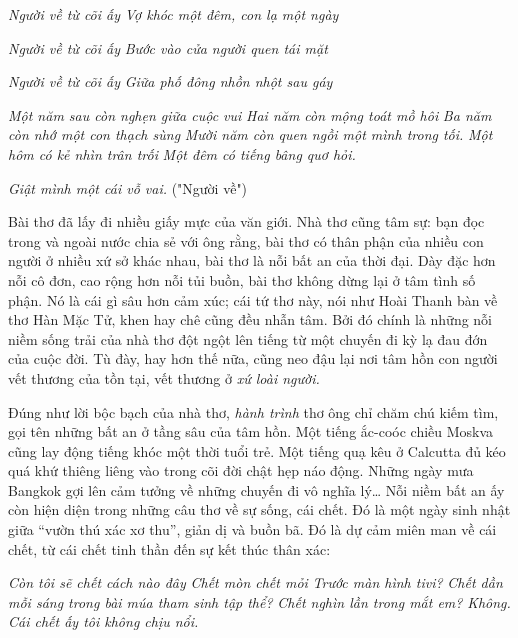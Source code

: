 \documentclass[../main.tex]{subfiles}
\begin{document}
\begin{multicols}{2}
\begin{blockquote}
\textit{Người về từ cõi ấy} 
\textit{Vợ khóc một đêm, con lạ một ngày} 
        
\textit{Người về từ cõi ấy} 
\textit{Bước vào cửa người quen tái mặt} 
        
\textit{Người về từ cõi ấy} 
\textit{Giữa phố đông nhồn nhột sau gáy} 
        
\textit{Một năm sau còn nghẹn giữa cuộc vui}        
\textit{Hai năm còn mộng toát mồ hôi}        
\textit{Ba năm còn nhớ một con thạch sùng}        
\textit{Mười năm còn quen ngồi một mình trong tối.}        
\textit{Một hôm có kẻ nhìn trân trối} 
\textit{Một đêm có tiếng bâng quơ hỏi. } 
        
\textit{Giật mình một cái vỗ vai. }        
("Người về") 

\end{blockquote}
 
Bài thơ đã lấy đi nhiều giấy mực của văn giới. Nhà thơ cũng tâm sự: bạn đọc trong và ngoài nước chia sẻ với ông rằng, bài thơ có thân phận của nhiều con người ở nhiều xứ sở khác nhau, bài thơ là nỗi bất an của thời đại. Dày đặc hơn nỗi cô đơn, cao rộng hơn nỗi tủi buồn, bài thơ không dừng lại ở tâm tình số phận. Nó là cái gì sâu hơn cảm xúc; cái tứ thơ này, nói như Hoài Thanh bàn về thơ Hàn Mặc Tử, khen hay chê cũng đều nhẫn tâm. Bởi đó chính là những nỗi niềm sống trải của nhà thơ đột ngột lên tiếng từ một chuyến đi kỳ lạ đau đớn của cuộc đời. Tù đày, hay hơn thế nữa, cũng neo đậu lại nơi tâm hồn con người vết thương của tồn tại, vết thương ở \textit{xứ loài người. } 
 
Đúng như lời bộc bạch của nhà thơ, \textit{hành trình} thơ ông chỉ chăm chú kiếm tìm, gọi tên những bất an ở tầng sâu của tâm hồn. Một tiếng ắc-coóc chiều Moskva cũng lay động tiếng khóc một thời tuổi trẻ. Một tiếng quạ kêu ở Calcutta đủ kéo quá khứ thiêng liêng vào trong cõi đời chật hẹp náo động. Những ngày mưa Bangkok gợi lên cảm tưởng về những chuyến đi vô nghĩa lý… Nỗi niềm bất an ấy còn hiện diện trong những câu thơ về sự sống, cái chết. Đó là một ngày sinh nhật giữa “vườn thú xác xơ thu”, giản dị và buồn bã. Đó là dự cảm miên man về cái chết, từ cái chết tinh thần đến sự kết thúc thân xác:        
\begin{blockquote}
        
\textit{Còn tôi sẽ chết cách nào đây}        
\textit{Chết mòn chết mỏi}        
\textit{Trước màn hình tivi?}        
\textit{Chết dần mỗi sáng trong bài múa tham sinh tập thể?}        
\textit{Chết nghìn lần trong mắt em?} 
\textit{Không. Cái chết ấy tôi không chịu nổi.} 
        

\end{blockquote}
\end{multicols}
\end{document}
